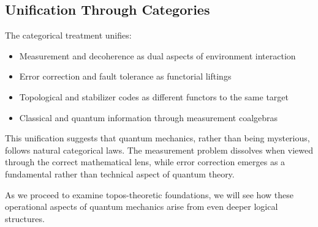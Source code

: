\subsection{Unification Through Categories}

The categorical treatment unifies:

\begin{itemize}[leftmargin=*]
\item Measurement and decoherence as dual aspects of environment interaction
\item Error correction and fault tolerance as functorial liftings
\item Topological and stabilizer codes as different functors to the same target
\item Classical and quantum information through measurement coalgebras
\end{itemize}

This unification suggests that quantum mechanics, rather than being mysterious, follows natural categorical laws. The measurement problem dissolves when viewed through the correct mathematical lens, while error correction emerges as a fundamental rather than technical aspect of quantum theory.

As we proceed to examine topos-theoretic foundations, we will see how these operational aspects of quantum mechanics arise from even deeper logical structures.